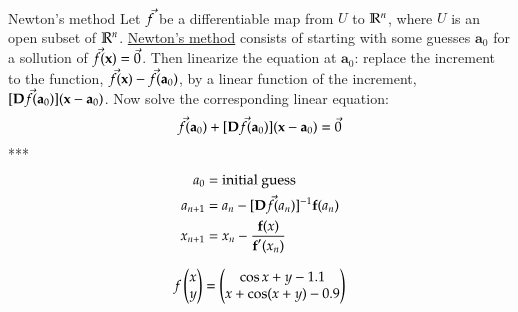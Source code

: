 \\

\begin{defn}{Newton's method}
Let $\textbf{\ensuremath{\Vec{f}}}$ be a differentiable map from $U$ to $\mathbb{R}^n$, where $U$ is an open subset of $\mathbb{R}^n$. \ul{Newton's method} consists of starting with some guesses $\bm{a}_0$ for a sollution of $\textbf{\ensuremath{\Vec{f}}}(\textbf{x})=\Vec{0}$. Then linearize the equation at $\bm{a}_0$: replace the increment to the function, $\textbf{\ensuremath{\Vec{f}}}(\textbf{x})-\textbf{\ensuremath{\Vec{f}}}(\textbf{a}_0)$, by a linear function of the increment, $[\textbf{D\ensuremath{\Vec{f}}}(\textbf{a}_0)](\textbf{x}-\textbf{a}_0)$. Now solve the corresponding linear equation:
  \[\Vec{f}(\textbf{a}_0)+[\textbf{D\ensuremath{\Vec{f}}}(\textbf{a}_0)](\textbf{x}-\textbf{a}_0)=\Vec{0}\]
  ***
  \begin{align*}
    a_0 &= \text{initial guess} \\
    a_{n+1} &= a_n - [\textbf{D\ensuremath{\Vec{f}}}(a_n)]^{-1} \textbf{f}(a_n) \\
    x_{n+1} &= x_n - \frac{\textbf{f}(x)}{\textbf{f}'(x_n)}
  \end{align*}
\end{defn}

\example
\[f\begin{pmatrix} x \\ y \end{pmatrix} = \begin{pmatrix} \cos x + y - 1.1 \\  x + \cos (x + y) - 0.9 \end{pmatrix}\]
